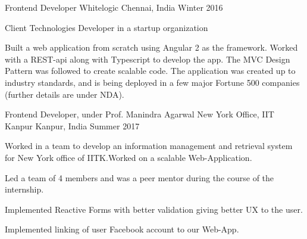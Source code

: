 

\begin{cventries}

  \cventry
    {Frontend Developer} %
    {Whitelogic} %
    {Chennai, India} %
    {Winter 2016} %
    {
      \begin{cvitems} %
      \item {Client Technologies Developer in a startup organization}
        \item {Built a web application from scratch using Angular 2 as the framework.
            Worked with a REST-api along with Typescript to develop the app. The MVC Design 
            Pattern was followed to create scalable code. The application was created up to
            industry standards, and is being deployed in a few major Fortune 500 companies 
            (further details are under NDA).  }
      \end{cvitems}
    }
    
    \cventry
      {Frontend Developer, under Prof. Manindra Agarwal} %
      {New York Office, IIT Kanpur} %
      {Kanpur, India} %
      {Summer 2017} %
    {
      \begin{cvitems} %
      \item {Worked in a team to develop an information management and retrieval system for New York office of IITK.Worked on a scalable Web-Application.}
      \item {Led a team of 4 members and was a peer mentor during the course of the
          internship.}
      \item	{Implemented Reactive Forms with better validation giving better UX to the user.}
      \item {Implemented linking of user Facebook account to our Web-App.}
      \end{cvitems}
    }

\end{cventries}
